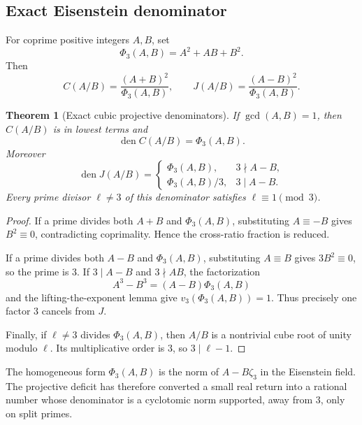 \documentclass[11pt]{article}
\newtheorem{theorem}{Theorem}[section]
\theoremstyle{definition}
\theoremstyle{remark}
\newcommand{\den}{\operatorname{den}}
\begin{document}
\subsection{Exact Eisenstein denominator}

For coprime positive integers $A,B$, set
\begin{equation}\label{eq:Phi3}
 \Phi_3(A,B)=A^2+AB+B^2.
\end{equation}
Then
\begin{equation}\label{eq:CJAB}
 C(A/B)=\frac{(A+B)^2}{\Phi_3(A,B)},
 \qquad
 J(A/B)=\frac{(A-B)^2}{\Phi_3(A,B)}.
\end{equation}

\begin{theorem}[Exact cubic projective denominators]\label{thm:Phi3-den}
If $\gcd(A,B)=1$, then $C(A/B)$ is in lowest terms and
\begin{equation}\label{eq:Cden}
 \den C(A/B)=\Phi_3(A,B).
\end{equation}
Moreover
\begin{equation}\label{eq:Jden}
 \den J(A/B)=
 \begin{cases}
 \Phi_3(A,B),&3\nmid A-B,\\
 \Phi_3(A,B)/3,&3\mid A-B.
 \end{cases}
\end{equation}
Every prime divisor $\ell\ne3$ of this denominator satisfies $\ell\equiv1\pmod3$.
\end{theorem}

\begin{proof}
If a prime divides both $A+B$ and $\Phi_3(A,B)$, substituting $A\equiv-B$ gives $B^2\equiv0$, contradicting coprimality.  Hence the cross-ratio fraction is reduced.

If a prime divides both $A-B$ and $\Phi_3(A,B)$, substituting $A\equiv B$ gives $3B^2\equiv0$, so the prime is $3$.  If $3\mid A-B$ and $3\nmid AB$, the factorization
\[
 A^3-B^3=(A-B)\Phi_3(A,B)
\]
and the lifting-the-exponent lemma give $v_3(\Phi_3(A,B))=1$.  Thus precisely one factor $3$ cancels from $J$.

Finally, if $\ell\ne3$ divides $\Phi_3(A,B)$, then $A/B$ is a nontrivial cube root of unity modulo $\ell$.  Its multiplicative order is $3$, so $3\mid\ell-1$.
\end{proof}

The homogeneous form $\Phi_3(A,B)$ is the norm of $A-B\zeta_3$ in the Eisenstein field.  The projective deficit has therefore converted a small real return into a rational number whose denominator is a cyclotomic norm supported, away from $3$, only on split primes.
\end{document}
